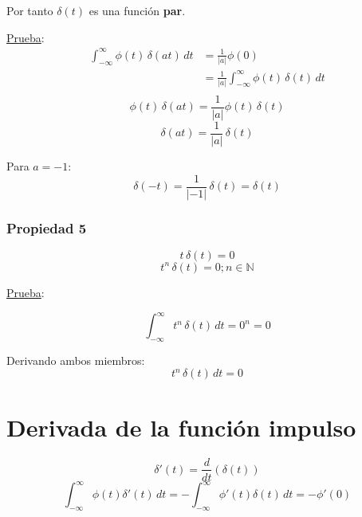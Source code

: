 Por tanto $\delta(t)$ es una función \textbf{par}.

\underline{Prueba}:
\begin{equation*}
\begin{split}
    \int_{-\infty}^{\infty}\phi(t)\,\delta(at)\,dt
        &=\frac{1}{|a|}\phi(0)\\
        &=\frac{1}{|a|}\int_{-\infty}^{\infty}\phi(t)\,\delta(t)\,dt\\
\end{split}
\end{equation*}
\begin{equation*}
    \phi(t)\,\delta(at)=\frac{1}{|a|}\phi(t)\,\delta(t)
\end{equation*}
\begin{equation*}
    \delta(at)=\frac{1}{|a|}\,\delta(t)
\end{equation*}

Para $a=-1$:
\begin{equation*}
    \delta(-t)=\frac{1}{|-1|}\,\delta(t)=\delta(t)
\end{equation*}

\subsubsection*{Propiedad 5}
\begin{equation*}
    t\,\delta(t)=0
\end{equation*}
\begin{equation}
    t^n\,\delta(t)=0; n\in\mathbb{N}
\end{equation}

\underline{Prueba}:

\begin{equation*}
    \int_{-\infty}^{\infty}t^n\,\delta(t)\,dt=0^n=0
\end{equation*}

Derivando ambos miembros:
\begin{equation*}
    t^n\,\delta(t)\,dt=0
\end{equation*}

\section{Derivada de la función impulso}
\begin{equation*}
    \delta'(t)=\frac{d}{dt}(\delta(t))
\end{equation*}
\begin{equation}
    \int_{-\infty}^{\infty}\phi(t)\delta'(t)\,dt
        =-\int_{-\infty}^{\infty}\phi'(t)\delta(t)\,dt
        =-\phi'(0)
\end{equation}

